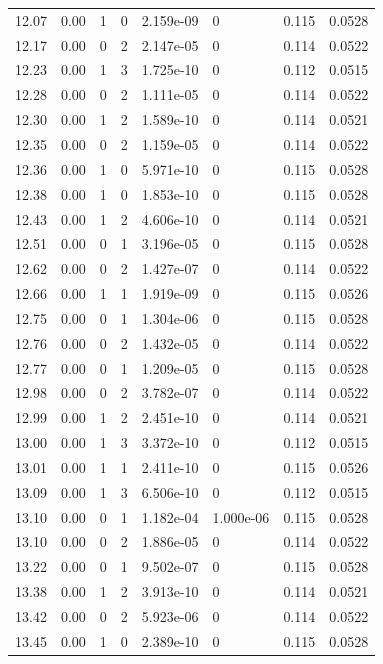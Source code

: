 \documentclass[preview]{standalone}
\begin{document}
{{{{{\begin{tabular}{L{1.2cm}C{1.2cm} C{0.3cm}C{0.5cm} C{1.4cm}C{1.4cm} C{1.4cm}C{1.4cm}}
  12.07  &  0.00  & 1     &  0 &  2.159e-09  & 0  & 0.115 &  0.0528   \\ 
  12.17  &  0.00  & 0     &  2 &  2.147e-05  & 0  & 0.114 &  0.0522   \\ 
  12.23  &  0.00  & 1     &  3 &  1.725e-10  & 0  & 0.112 &  0.0515   \\ 
  12.28  &  0.00  & 0     &  2 &  1.111e-05  & 0  & 0.114 &  0.0522   \\ 
  12.30  &  0.00  & 1     &  2 &  1.589e-10  & 0  & 0.114 &  0.0521   \\ 
  12.35  &  0.00  & 0     &  2 &  1.159e-05  & 0  & 0.114 &  0.0522   \\ 
  12.36  &  0.00  & 1     &  0 &  5.971e-10  & 0  & 0.115 &  0.0528   \\ 
  12.38  &  0.00  & 1     &  0 &  1.853e-10  & 0  & 0.115 &  0.0528   \\ 
  12.43  &  0.00  & 1     &  2 &  4.606e-10  & 0  & 0.114 &  0.0521   \\ 
  12.51  &  0.00  & 0     &  1 &  3.196e-05  & 0  & 0.115 &  0.0528   \\ 
  12.62  &  0.00  & 0     &  2 &  1.427e-07  & 0  & 0.114 &  0.0522   \\ 
  12.66  &  0.00  & 1     &  1 &  1.919e-09  & 0  & 0.115 &  0.0526   \\ 
  12.75  &  0.00  & 0     &  1 &  1.304e-06  & 0  & 0.115 &  0.0528   \\ 
  12.76  &  0.00  & 0     &  2 &  1.432e-05  & 0  & 0.114 &  0.0522   \\ 
  12.77  &  0.00  & 0     &  1 &  1.209e-05  & 0  & 0.115 &  0.0528   \\ 
  12.98  &  0.00  & 0     &  2 &  3.782e-07  & 0  & 0.114 &  0.0522   \\ 
  12.99  &  0.00  & 1     &  2 &  2.451e-10  & 0  & 0.114 &  0.0521   \\ 
  13.00  &  0.00  & 1     &  3 &  3.372e-10  & 0  & 0.112 &  0.0515   \\ 
  13.01  &  0.00  & 1     &  1 &  2.411e-10  & 0  & 0.115 &  0.0526   \\ 
  13.09  &  0.00  & 1     &  3 &  6.506e-10  & 0  & 0.112 &  0.0515   \\ 
  13.10  &  0.00  & 0     &  1 &  1.182e-04  & 1.000e-06  & 0.115 &  0.0528   \\ 
  13.10  &  0.00  & 0     &  2 &  1.886e-05  & 0  & 0.114 &  0.0522   \\ 
  13.22  &  0.00  & 0     &  1 &  9.502e-07  & 0  & 0.115 &  0.0528   \\ 
  13.38  &  0.00  & 1     &  2 &  3.913e-10  & 0  & 0.114 &  0.0521   \\ 
  13.42  &  0.00  & 0     &  2 &  5.923e-06  & 0  & 0.114 &  0.0522   \\ 
  13.45  &  0.00  & 1     &  0 &  2.389e-10  & 0  & 0.115 &  0.0528   \\ 
\hline 
\end{tabular} 

}}}}}
\end{document}
